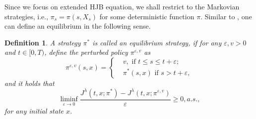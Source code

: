\documentclass[11pt]{article}
\newtheorem{definition}{Definition}[section]
\begin{document}
Since we focus on extended HJB equation, we shall restrict to the Markovian strategies, i.e., $\pi_s=\pi(s,X_s)$ for some deterministic function $\pi$.  Similar to \cite{bjork2017time}, one can define an equilibrium in the following sense. 
\begin{definition}
A strategy $\pi^*$ is called an equilibrium strategy, if for any $\varepsilon,v >0$ and $ t\in [0,T)$, define the perturbed policy $\pi^{\varepsilon,v}$  as 
\begin{equation*}
\pi^{\varepsilon,v}(s,x)=
\left\{
\begin{split}
&v,\text{ if $t \le s \le t+\varepsilon$};\\
&\pi^*(s,x)\text{ if $s>t+\varepsilon$},
\end{split}
\right.
\end{equation*}
and it holds that 
$$
\liminf_{\varepsilon \rightarrow 0} \frac{J^{\lambda}(t,x;\pi^*)-J^{\lambda}(t,x;\pi^{\varepsilon,v})}{\varepsilon} \ge 0, a.s.,
$$
for any initial state $x$.
\end{definition}
\end{document}
